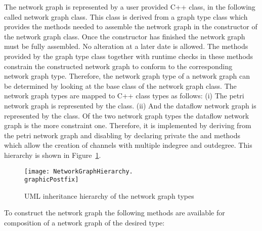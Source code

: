 The network graph is represented by a user provided C++ class, in the following called
network graph class. This class is derived from a \SysteMoC{} graph type class which
provides the methods needed to assemble the network graph in the constructor
of the network graph class. Once the constructor has finished the network graph must
be fully assembled. No alteration at a later date is allowed.
The methods provided by the \SysteMoC{} graph type class together with runtime checks
in these methods constrain the constructed network graph to conform to the corresponding
network graph type.
Therefore, the network graph type of a network graph can be determined by looking
at the base class of the network graph class.
The network graph types are mapped to C++ class types as follows:
(i) The petri network graph is represented by the  class.
(ii) And the dataflow network graph is represented by the  class.
Of the two network graph types the dataflow network graph is the more constraint
one. Therefore, it is implemented by deriving from the petri network graph
and disabling by declaring private the  and 
methods which allow the creation of channels with multiple indegree and outdegree.
This hierarchy is shown in Figure~\ref{network-graph-hierarchy}.

\begin{figure}[h]
\centering
\texttt{[image: NetworkGraphHierarchy.\\graphicPostfix]}\\
\caption{\label{network-graph-hierarchy}UML inheritance hierarchy of the network graph types}
\end{figure}

To construct the network graph the following methods are available for
composition of a network graph of the desired type:

